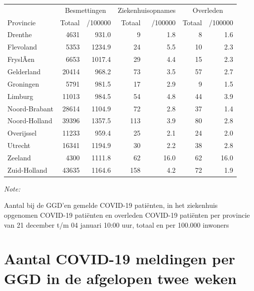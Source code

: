 \documentclass[
  english,
  man,floatsintext]{apa6}
\begin{document}
\begin{table}
\centering
\begin{threeparttable}
\begin{tabular}{lrrrrrr}
\toprule
\multicolumn{1}{c}{ } & \multicolumn{2}{c}{Besmettingen} & \multicolumn{2}{c}{Ziekenhuisopnames} & \multicolumn{2}{c}{Overleden} \\
\cmidrule(l{3pt}r{3pt}){2-3} \cmidrule(l{3pt}r{3pt}){4-5} \cmidrule(l{3pt}r{3pt}){6-7}
Provincie & Totaal & /100000 & Totaal & /100000 & Totaal & /100000\\
\midrule
Drenthe & 4631 & 931.0 & 9 & 1.8 & 8 & 1.6\\
Flevoland & 5353 & 1234.9 & 24 & 5.5 & 10 & 2.3\\
FryslÃ¢n & 6653 & 1017.4 & 29 & 4.4 & 15 & 2.3\\
Gelderland & 20414 & 968.2 & 73 & 3.5 & 57 & 2.7\\
Groningen & 5791 & 981.5 & 17 & 2.9 & 9 & 1.5\\
Limburg & 11013 & 984.5 & 54 & 4.8 & 44 & 3.9\\
Noord-Brabant & 28614 & 1104.9 & 72 & 2.8 & 37 & 1.4\\
Noord-Holland & 39396 & 1357.5 & 113 & 3.9 & 80 & 2.8\\
Overijssel & 11233 & 959.4 & 25 & 2.1 & 24 & 2.0\\
Utrecht & 16341 & 1194.9 & 30 & 2.2 & 38 & 2.8\\
Zeeland & 4300 & 1111.8 & 62 & 16.0 & 62 & 16.0\\
Zuid-Holland & 43635 & 1164.6 & 158 & 4.2 & 72 & 1.9\\
\bottomrule
\end{tabular}
\begin{tablenotes}
\item \textit{Note: } 
\item Aantal bij de GGD’en gemelde COVID-19 patiënten, in het ziekenhuis opgenomen COVID-19 patiënten en overleden COVID-19 patiënten per provincie van 21 december t/m 04 januari 10:00 uur, totaal en per 100.000 inwoners
\end{tablenotes}
\end{threeparttable}
\end{table}

\newpage

\hypertarget{aantal-covid-19-meldingen-per-ggd-in-de-afgelopen-twee-weken}{%
\section{Aantal COVID-19 meldingen per GGD in de afgelopen twee weken}\label{aantal-covid-19-meldingen-per-ggd-in-de-afgelopen-twee-weken}}
\end{document}
